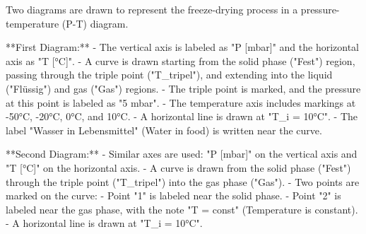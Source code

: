 Two diagrams are drawn to represent the freeze-drying process in a pressure-temperature (P-T) diagram.  

**First Diagram:**  
- The vertical axis is labeled as "P [mbar]" and the horizontal axis as "T [°C]".  
- A curve is drawn starting from the solid phase ("Fest") region, passing through the triple point ("T_tripel"), and extending into the liquid ("Flüssig") and gas ("Gas") regions.  
- The triple point is marked, and the pressure at this point is labeled as "5 mbar".  
- The temperature axis includes markings at -50°C, -20°C, 0°C, and 10°C.  
- A horizontal line is drawn at "T_i = 10°C".  
- The label "Wasser in Lebensmittel" (Water in food) is written near the curve.  

**Second Diagram:**  
- Similar axes are used: "P [mbar]" on the vertical axis and "T [°C]" on the horizontal axis.  
- A curve is drawn from the solid phase ("Fest") through the triple point ("T_tripel") into the gas phase ("Gas").  
- Two points are marked on the curve:  
  - Point "1" is labeled near the solid phase.  
  - Point "2" is labeled near the gas phase, with the note "T = const" (Temperature is constant).  
- A horizontal line is drawn at "T_i = 10°C".